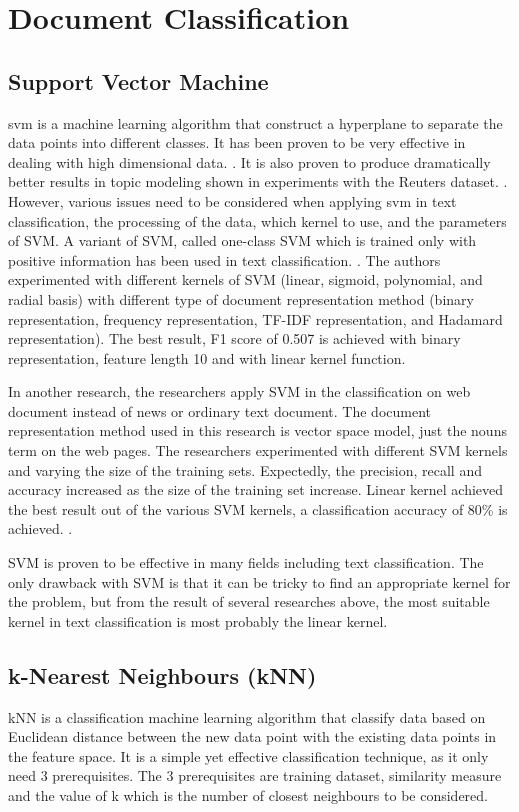 \clearpage	
\section{Document Classification}
\subsection{Support Vector Machine}
\ac{svm} is a machine learning algorithm that construct a hyperplane to separate the data points into different classes. It has been proven to be very effective in dealing with high dimensional data. \cite{webSvm}. It is also proven to produce dramatically better results in topic modeling shown in experiments with the Reuters dataset. \cite{inductiveText}. However, various issues need to be considered when applying \ac{svm} in text classification, the processing of the data, which kernel to use, and the parameters of SVM. A variant of SVM, called one-class SVM which is trained only with positive information has been used in text classification. \cite{oneSvm}.  The authors experimented with different kernels of SVM (linear, sigmoid, polynomial, and radial basis) with different type of document representation method (binary representation, frequency representation, TF-IDF representation, and Hadamard representation). The best result, F1 score of 0.507 is achieved with binary representation, feature length 10 and with linear kernel function.  
	
In another research, the researchers apply SVM in the classification on web document instead of news or ordinary text document. The document representation method used in this research is vector space model, just the nouns term on the web pages. The researchers experimented with different SVM kernels and varying the size of the training sets. Expectedly, the precision, recall and accuracy increased as the size of the training set increase. Linear kernel achieved the best result out of the various SVM kernels, a classification accuracy of 80\% is achieved. \cite{webSvm}.
	
SVM is proven to be effective in many fields including text classification. The only drawback with SVM is that it can be tricky to find an appropriate kernel for the problem, but from the result of several researches above, the most suitable kernel in text classification is most probably the linear kernel.\\


\subsection{k-Nearest Neighbours (kNN)}
kNN is a classification machine learning algorithm that classify data based on Euclidean distance between the new data point with the existing data points in the feature space. It is a simple yet effective classification technique, as it only need 3 prerequisites. The 3 prerequisites are training dataset, similarity measure and the value of k which is the number of closest neighbours to be considered. 

